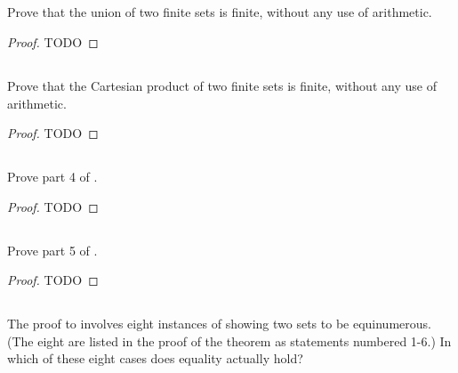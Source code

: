 \documentclass{report}
\begin{document}
\subsection{}%

  Prove that the union of two finite sets is finite, without any use of
    arithmetic.

  \begin{proof}
    TODO
  \end{proof}

\subsection{}%

  Prove that the Cartesian product of two finite sets is finite, without any use
    of arithmetic.

  \begin{proof}
    TODO
  \end{proof}

\subsection{}%

  Prove part 4 of .

  \begin{proof}
    TODO
  \end{proof}

\subsection{}%

  Prove part 5 of .

  \begin{proof}
    TODO
  \end{proof}

\subsection{}%

  The proof to  involves eight instances of showing two
    sets to be equinumerous.
  (The eight are listed in the proof of the theorem as statements numbered 1-6.)
  In which of these eight cases does equality actually hold?
\end{document}
